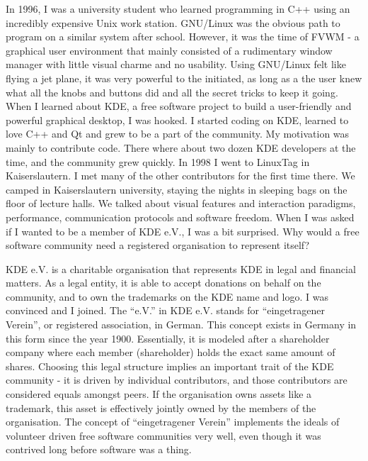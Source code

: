 

\noindent{}In 1996, I was a university student who learned programming
in C++ using an incredibly expensive Unix work station. GNU/Linux was the
obvious path to program on a similar system after school. However, it
was the time of FVWM - a graphical user environment that mainly
consisted of a rudimentary window manager with little visual charme
and no usability. Using GNU/Linux felt like flying a jet plane, it was
very powerful to the 
initiated, as long as a the user knew what all the knobs and buttons
did and all the secret tricks to keep it going. When I learned about
KDE, a free software project to build a 
user-friendly and powerful graphical desktop, I was hooked. I
started coding on KDE, learned to love C++ and Qt and grew to be a
part of the community. My motivation was mainly to contribute
code. There where about two dozen KDE developers at the 
time, and the community grew quickly. In 1998 I went to LinuxTag in
Kaiserslautern. I met many of the other contributors for the first
time there. We camped in Kaiserslautern university, staying the nights
in sleeping bags on the floor of lecture halls. We talked about
visual features and interaction paradigms, performance, communication
protocols and software freedom. When I was asked if I wanted to be a
member of KDE e.V., I was a bit surprised. Why would a free software
community need a registered organisation to represent itself?

KDE e.V. is a charitable organisation that represents KDE
in legal and financial matters. As a legal entity, it is able to 
accept donations on behalf on the community, and to own the trademarks
on the KDE name and logo. I was convinced and I joined. The ``e.V.''
in KDE e.V. stands for ``eingetragener Verein'', or registered
association, in German. This concept exists in Germany in this form
since the year 1900. Essentially, it is modeled after a shareholder
company where each member (shareholder) holds the exact same amount of
shares. Choosing this legal structure implies an important trait of the
KDE community - it is driven by individual contributors, and those
contributors are considered equals amongst peers. If the organisation
owns assets like a trademark, this asset is effectively jointly owned
by the members of the organisation. The concept of ``eingetragener
Verein'' implements the ideals of volunteer driven free software
communities very well, even though it was contrived long before
software was a thing.

